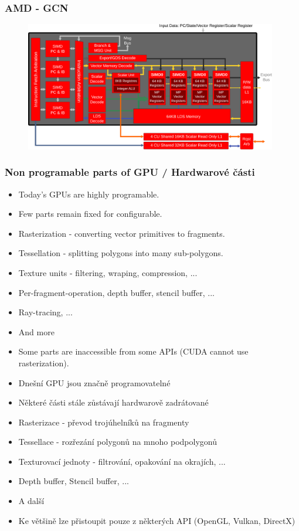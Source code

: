 \begin{frame}
\frametitle{AMD - GCN}
	\begin{figure}[h]
	\includegraphics[width=11cm,keepaspectratio]{pics/gpu/gcn}
	\end{figure}
\end{frame}

\begin{frame}
\frametitle{Non programable parts of GPU / Hardwarové části}
  \scriptsize
	\begin{itemize}
	\item Today's GPUs are highly programable.
  \item Few parts remain fixed for configurable.
  \item Rasterization - converting vector primitives to fragments.
  \item Tessellation - splitting polygons into many sub-polygons.
  \item Texture units - filtering, wraping, compression, ...
  \item Per-fragment-operation, depth buffer, stencil buffer, ...
  \item Ray-tracing, ...
  \item And more
  \item Some parts are inaccessible from some APIs (CUDA cannot use rasterization).
	\end{itemize}
	\begin{itemize}
	\item Dnešní GPU jsou značně programovatelné
  \item Některé části stále zůstávají hardwarově zadrátované
  \item Rasterizace - převod trojúhelníků na fragmenty
  \item Tessellace - rozřezání polygonů na mnoho podpolygonů
  \item Texturovací jednoty - filtrování, opakování na okrajích, ...
  \item Depth buffer, Stencil buffer, ...
  \item A další
  \item Ke většině lze přistoupit pouze z některých API (OpenGL, Vulkan, DirectX)
	\end{itemize}
\end{frame}

